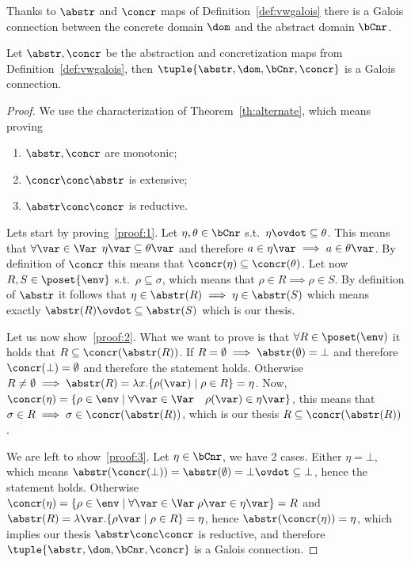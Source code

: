 Thanks to \(\abstr\) and \(\concr\) maps of
Definition~\ref{def:vwgalois} there is a Galois connection between
the concrete domain \(\dom\) and the abstract domain \(\bCnr\).

\begin{lemma}
  Let \(\abstr, \concr\) be the abstraction and concretization maps
  from Definition~\ref{def:vwgalois}, then
  \(\tuple{\abstr, \dom, \bCnr, \concr}\) is a Galois connection.
\end{lemma}

\begin{proof}
  We use the characterization of Theorem~\ref{th:alternate}, which
  means proving
  \begin{enumerate}[label=(\roman*)]
  \item\label{proof:1} \(\abstr,\concr\) are monotonic;
  \item\label{proof:2} \(\concr \conc \abstr\) is extensive;
  \item\label{proof:3} \(\abstr\conc\concr\) is reductive.
  \end{enumerate}

  Lets start by proving~\ref{proof:1}. Let \(\eta, \theta \in \bCnr\)
  s.t.\ \(\eta\ovdot\subseteq\theta\). This means that
  \(\forall \var\in\Var\) \(\eta\var \subseteq \theta\var\) and
  therefore \(a\in\eta\var \implies a\in\theta\var\). By definition of
  \(\concr\) this means that
  \(\concr(\eta) \subseteq \concr(\theta)\). Let now
  \(R, S \in \poset{\env}\) s.t.\ \(\rho \subseteq \sigma\), which
  means that \(\rho \in R \implies \rho \in S\). By definition of
  \(\abstr\) it follows that
  \(\eta \in \abstr(R) \implies \eta \in \abstr(S)\) which means
  exactly \(\abstr(R) \ovdot\subseteq \abstr(S)\) which is our thesis.

  Let us now show~\ref{proof:2}. What we want to prove is that
  \(\forall R\in\poset(\env)\) it holds that
  \(R \subseteq \concr(\abstr(R))\). If
  \(R = \emptyset \implies \abstr(\emptyset) = \bot\) and therefore
  \(\concr(\bot) = \emptyset\) and therefore the statement
  holds. Otherwise
  \(R \neq \emptyset \implies \abstr(R) = \lambda x . \{\rho(\var)
  \mid \rho \in R\} = \eta\). Now,
  \(\concr(\eta) = \{\rho \in \env \mid \forall \var\in\Var \quad
  \rho(\var) \in \eta\var\}\), this means that
  \(\sigma \in R \implies \sigma \in \concr(\abstr(R))\), which is our
  thesis \(R \subseteq \concr(\abstr(R))\).

  We are left to show~\ref{proof:3}. Let \(\eta \in \bCnr\), we have 2
  cases. Either \(\eta = \bot\), which means
  \(\abstr(\concr(\bot)) = \abstr(\emptyset) = \bot \ovdot\subseteq
  \bot\), hence the statement holds. Otherwise
  \(\concr(\eta) = \{\rho \in \env \mid \forall \var\in\Var \;
  \rho\var \in \eta\var\} = R\) and
  \(\abstr(R) = \lambda\var.\{\rho\var \mid \rho\in R\} =\eta\), hence
  \(\abstr(\concr(\eta)) = \eta\), which implies our thesis
  \(\abstr \conc \concr\) is reductive, and therefore
  \(\tuple{\abstr, \dom, \bCnr, \concr}\) is a Galois connection.
\end{proof}

